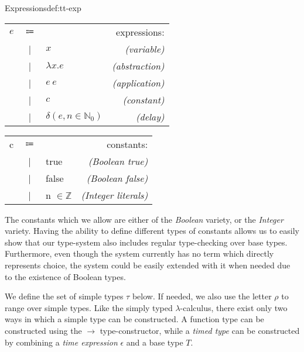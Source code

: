 \begin{definitiontitled}{Expressions}{def:tt-exp}
\begin{minipage}[b]{0.50\linewidth}
\begin{tabular}{lclr}
$e$     & $\Coloneqq$ &                                         & expressions:            \\
        & |    & $x$                                            & \textit{(variable)}     \\
        & |    & $\lambda x.e$                                  & \textit{(abstraction)}  \\
        & |    & $e \: e$                                       & \textit{(application)}  \\
        & |    & $c$                                            & \textit{(constant)}     \\
        & |    & $\delta(e,n \in \mathbb{N}_0)$                                  & \textit{(delay)}        \\
\end{tabular}
\end{minipage}
\begin{minipage}[b]{0.40\linewidth}
\begin{tabular}{lclr}
c       & $\Coloneqq$ &                                         & constants:                  \\
        & |    & true                                           & \textit{(Boolean true)}     \\
        & |    & false                                          & \textit{(Boolean false)}    \\
        & |    & n $\in \mathbb{Z}$                             & \textit{(Integer literals)} \\
\end{tabular}
\end{minipage}
\end{definitiontitled}

The constants which we allow are either of the \textit{Boolean} variety, or the \textit{Integer} variety.
Having the ability to define different types of constants allows us to easily show that our type-system also includes regular type-checking over base types.
Furthermore, even though the system currently has no term which directly represents choice, the system could be easily extended with it when needed due to the existence of Boolean types.

We define the set of simple types $\tau$ below.
If needed, we also use the letter $\rho$ to range over simple types.
Like the simply typed $\lambda$-calculus, there exist only two ways in which a simple type can be constructed.
A function type can be constructed using the $\to$ type-constructor, while a \textit{timed type} can be constructed by combining a \textit{time expression} $\epsilon$ and a base type $T$.

